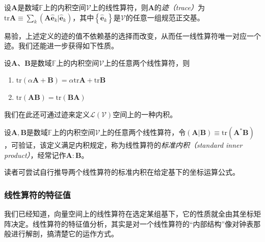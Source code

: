 \documentclass[../main.tex]{subfiles}
\begin{document}
\begin{definition}[线性算符的迹]\label{def:II.2.19}
    设$\mathbf{A}$是数域$\mathbb{F}$上的内积空间$\mathcal{V}$上的线性算符，则$\mathbf{A}$的\emph{迹（trace）}为$\mathrm{tr}\mathbf{A}\equiv\sum_k\left(\mathbf{A}\mathbf{\hat{e}}_k|\mathbf{\hat{e}}_k\right)$，其中$\left\{\mathbf{\hat{e}}_k\right\}$是$\mathcal{V}$的任意一组规范正交基。
\end{definition}

易验，上述定义的迹的值不依赖基的选择而改变，从而任一线性算符唯一对应一个迹。我们还能进一步获得如下性质。

\begin{theorem}\label{thm:II.2.25}
    设$\mathbf{A}$、$\mathbf{B}$是数域$\mathbb{F}$上的内积空间$\mathcal{V}$上的任意两个线性算符，则
    \begin{enumerate}
        \item $\mathrm{tr}\left(\alpha\mathbf{A}+\mathbf{B}\right)=\alpha\mathrm{tr}\mathbf{A}+\mathrm{tr}\mathbf{B}$
        \item $\mathrm{tr}\left(\mathbf{AB}\right)=\mathrm{tr}\left(\mathbf{BA}\right)$
    \end{enumerate}
\end{theorem}

我们在此还可通过迹来定义$\mathcal{L}\left(\mathcal{V}\right)$空间上的一种内积。

\begin{definition}[线性算符的标准内积]\label{def:II.2.20}
    设$\mathbf{A},\mathbf{B}$是数域$\mathbb{F}$上的内积空间$\mathcal{V}$上的任意两个线性算符，令$\left(\mathbf{A}|\mathbf{B}\right)\equiv\mathrm{tr}\left(\mathbf{A}^*\mathbf{B}\right)$，可验证，该定义满足内积规定，称为线性算符的\emph{标准内积（standard inner product）}，经常记作$\mathbf{A}:\mathbf{B}$。
\end{definition}

读者可尝试自行推导两个线性算符的标准内积在给定基下的坐标运算公式。
\subsubsection{线性算符的特征值}
我们已经知道，向量空间上的线性算符在选定某组基下，它的性质就全由其坐标矩阵决定。线性算符的特征值分析，其实是对一个线性算符的“内部结构”像对钟表那般进行解剖，搞清楚它的运作方式。
\end{document}
